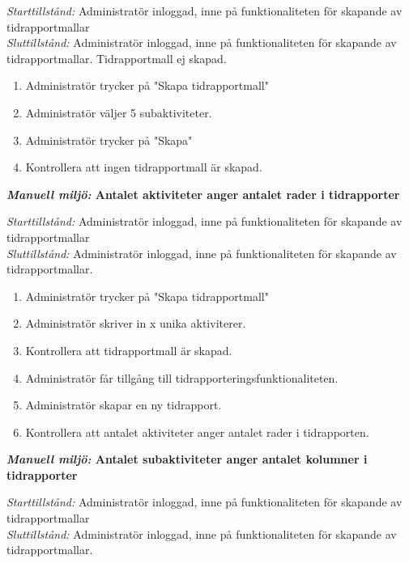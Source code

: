 \documentclass[a4paper]{article}
\begin{document}
\begin{FT}
\emph{Starttillstånd:} Administratör inloggad, inne på funktionaliteten för skapande av tidrapportmallar\\
\emph{Sluttillstånd:} Administratör inloggad, inne på funktionaliteten för skapande av tidrapportmallar. Tidrapportmall ej skapad.\\

\begin{enumerate}
\item Administratör trycker på "Skapa tidrapportmall"
\item Administratör väljer 5 subaktiviteter.
\item Administratör trycker på "Skapa"
\item Kontrollera att ingen tidrapportmall är skapad.
\end{enumerate}


\item
\textbf{\emph{Manuell miljö:} Antalet aktiviteter anger antalet rader i tidrapporter}

\emph{Starttillstånd:} Administratör inloggad, inne på funktionaliteten för skapande av tidrapportmallar\\
\emph{Sluttillstånd:} Administratör inloggad, inne på funktionaliteten för skapande av tidrapportmallar.\\

\begin{enumerate}
\item Administratör trycker på "Skapa tidrapportmall"
\item Administratör skriver in x unika aktiviterer.
\item Kontrollera att tidrapportmall är skapad.
\item Administratör får tillgång till tidrapporteringsfunktionaliteten.
\item Administratör skapar en ny tidrapport.
\item Kontrollera att antalet aktiviteter anger antalet rader i tidrapporten.
\end{enumerate}

\item
\textbf{\emph{Manuell miljö:} Antalet subaktiviteter anger antalet kolumner i tidrapporter}

\emph{Starttillstånd:} Administratör inloggad, inne på funktionaliteten för skapande av tidrapportmallar\\
\emph{Sluttillstånd:} Administratör inloggad, inne på funktionaliteten för skapande av tidrapportmallar.\\


\end{FT}
\end{document}
